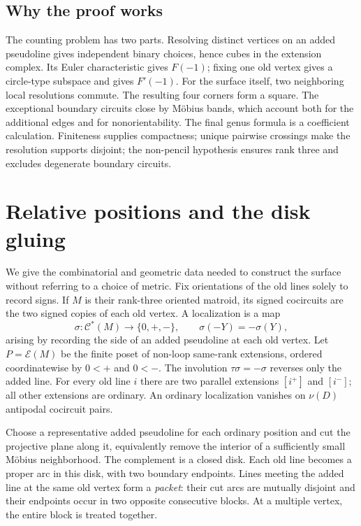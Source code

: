 \documentclass[11pt]{article}
\theoremstyle{definition}\newtheorem{definition}[theorem]{Definition}
\begin{document}
\subsection*{Why the proof works}
The counting problem has two parts. Resolving distinct vertices on an
added pseudoline gives independent binary choices, hence cubes in the
extension complex. Its Euler characteristic gives $F(-1)$; fixing one
old vertex gives a circle-type subspace and gives $F'(-1)$.
For the surface itself, two neighboring local resolutions commute.
The resulting four corners form a square. The exceptional boundary
circuits close by M\"obius bands, which account both for the additional
edges and for nonorientability. The final genus formula is a coefficient
calculation. Finiteness supplies compactness; unique pairwise crossings
make the resolution supports disjoint; the non-pencil hypothesis
ensures rank three and excludes degenerate boundary circuits.

\section{Relative positions and the disk gluing}\label{sec:construction}
We give the combinatorial and geometric data needed to construct the
surface without referring to a choice of metric.
Fix orientations of the old lines solely to record signs. If $M$ is
their rank-three oriented matroid, its signed cocircuits are the two
signed copies of each old vertex. A localization is a map
\[
 \sigma:\mathcal C^*(M)\longrightarrow\{0,+,-\},\qquad
 \sigma(-Y)=-\sigma(Y),
\]
arising by recording the side of an added pseudoline at each old vertex.
Let $P=\mathcal E(M)$ be the finite poset of non-loop same-rank
extensions, ordered coordinatewise by $0<+$ and $0<-$.
The involution $\tau\sigma=-\sigma$ reverses only the added line.
For every old line $i$ there are two parallel extensions $[i^+]$ and
$[i^-]$; all other extensions are ordinary. An ordinary localization
vanishes on $\nu(D)$ antipodal cocircuit pairs.

Choose a representative added pseudoline for each ordinary position
and cut the projective plane along it, equivalently remove the
interior of a sufficiently small M\"obius neighborhood. The complement
is a closed disk. Each old line becomes a proper arc in this disk,
with two boundary endpoints. Lines meeting the added line at the same
old vertex form a \emph{packet}: their cut arcs are mutually disjoint
and their endpoints occur in two opposite consecutive blocks.
At a multiple vertex, the entire block is treated together.
\end{document}
